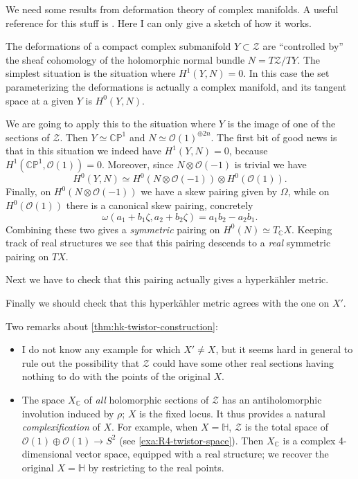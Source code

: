 \documentclass[12pt,letterpaper,reqno]{article}
\numberwithin{equation}{section}
\newcommand{\cZ}{\ensuremath{\mathcal Z}}
\newcommand{\cO}{\ensuremath{\mathcal O}}
\newcommand{\C}{\ensuremath{\mathbb C}}
\newcommand{\PP}{\ensuremath{\mathbb P}}
\newcommand{\bbH}{\ensuremath{\mathbb H}}
\newcommand{\hk}{hyperk\"ahler\xspace}
\newcommand{\ti}[1]{\textit{#1}}
\newcommand{\fixme}[1]{{\color{blue}{[#1]}}}
\begin{document}
\begin{pf} We need some results from deformation theory of 
complex manifolds. A useful reference for this stuff is
\cite{MR2093043}. Here I can only give a sketch of how it works.

The deformations of a compact complex submanifold $Y \subset \cZ$
are ``controlled by'' the sheaf cohomology of the 
holomorphic normal bundle $N = T\cZ / TY$.
The simplest situation is the situation where $H^1(Y,N) = 0$.
In this case the set parameterizing the deformations is 
actually a complex manifold, and its tangent space at a given 
$Y$ is $H^0(Y,N)$. 

We are going to apply this to the situation
where $Y$ is the image of one of the sections of $\cZ$.
Then $Y \simeq \C\PP^1$ and $N \simeq \cO(1)^{\oplus 2n}$.
The first bit of good 
news is that in this situation we indeed have $H^1(Y,N) = 0$,
because $H^1(\C\PP^1, \cO(1)) = 0$.
Moreover, since $N \otimes \cO(-1)$ is trivial
we have
\begin{equation}
  H^0(Y,N) \simeq H^0(N \otimes \cO(-1)) \otimes H^0(\cO(1)).
\end{equation}
Finally, on $H^0(N \otimes \cO(-1))$ we have a skew pairing
given by $\Omega$, while on $H^0(\cO(1))$ there is a canonical
skew pairing, concretely
\begin{equation}
  \omega(a_1 + b_1 \zeta, a_2 + b_2 \zeta) = a_1 b_2 - a_2 b_1.
\end{equation}
Combining these two gives a \ti{symmetric} pairing on 
$H^0(N) \simeq T_\C X$. Keeping track of real structures we see
that this pairing descends to a \ti{real} symmetric pairing
on $TX$. 

Next we have to check
that this pairing actually gives a \hk metric. \fixme{...}

Finally we should check that this \hk metric agrees with
the one on $X'$. \fixme{...}
\end{pf}

Two remarks about \autoref{thm:hk-twistor-construction}:
\begin{itemize}
\item I do not know any example for which $X' \neq X$, but it seems hard
in general to rule out the possibility that $\cZ$ could have some 
other real sections having nothing to do with the points of the original $X$.
\item The space $X_\C$ of \ti{all} holomorphic sections of $\cZ$ has an antiholomorphic
involution induced by $\rho$; $X$ is the fixed locus. It thus provides
a natural \ti{complexification} of $X$. For example, when $X = \bbH$,
$\cZ$ is the total space of $\cO(1) \oplus \cO(1) \to S^2$ 
(see \autoref{exa:R4-twistor-space}).
Then $X_\C$ is a complex 4-dimensional vector space,
equipped with a real structure; we recover the original $X = \bbH$
by restricting to the real points.
\end{itemize}
\end{document}
